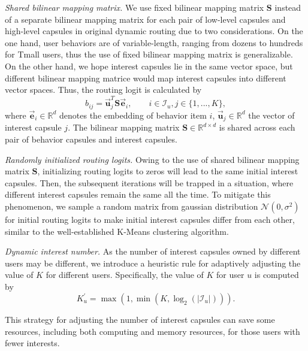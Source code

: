 \documentclass[sigconf]{acmart}
\begin{document}
\textit{Shared bilinear mapping matrix.}
We use fixed bilinear mapping matrix $\boldsymbol{\textrm{S}}$ instead of a separate bilinear mapping matrix for each pair of low-level capsules and high-level capsules in original dynamic routing due to two considerations.
On the one hand, user behaviors are of variable-length, ranging from dozens to hundreds for Tmall users, thus the use of fixed bilinear mapping matrix is generalizable.
On the other hand, we hope interest capsules lie in the same vector space, but different bilinear mapping matrice would map interest capsules into different vector spaces.
Thus, the routing logit is calculated by
\begin{equation}
b_{ij} = \overrightarrow{\boldsymbol{u}}_j^T \boldsymbol{\textrm{S}} \overrightarrow{\boldsymbol{e}}_i, \qquad i \in \mathcal{I}_{u}, j \in \{1,...,K \},
\end{equation}
where $\overrightarrow{\boldsymbol{e}}_i \in \mathbb{R}^{d}$ denotes the embedding of behavior item $i$, $\overrightarrow{\boldsymbol{u}}_j \in \mathbb{R}^{d}$ the vector of interest capsule $j$. The bilinear mapping matrix $\boldsymbol{\textrm{S}} \in \mathbb{R}^{d \times d}$ is shared across each pair of behavior capsules and interest capsules.

\textit{Randomly initialized routing logits.}
Owing to the use of shared bilinear mapping matrix $\boldsymbol{\textrm{S}}$, initializing routing logits to zeros will lead to the same initial interest capsules.
Then, the subsequent iterations will be trapped in a situation, where different interest capsules remain the same all the time.
To mitigate this phenomenon, we sample a random matrix from gaussian distribution $\mathcal N(0, \sigma ^ 2)$ for initial routing logits to make initial interest capsules differ from each other, similar to the well-established K-Means clustering algorithm.

\textit{Dynamic interest number.}
As the number of interest capsules owned by different users may be different, we introduce a heuristic rule for adaptively adjusting the value of $K$ for different users.
Specifically, the value of $K$ for user $u$ is computed by
\begin{equation}
\label{adaptive}
K_{u}^\prime = \max(1, \min(K, \log_2 (|\mathcal{I}_{u}|))).
\end{equation}

This strategy for adjusting the number of interest capsules can save some resources, including both computing and memory resources, for those users with fewer interests.
\end{document}
